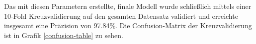 Das mit diesen Parametern erstellte, finale Modell wurde schließlich mittels einer 10-Fold Kreuzvalidierung auf den gesamten Datensatz validiert und erreichte insgesamt eine Präzision von 97.84\%.
Die Confusion-Matrix der Kreuzvalidierung ist in Grafik \ref{confusion-table} zu sehen.

